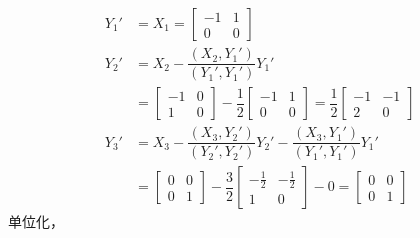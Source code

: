 \documentclass[12pt, a4paper, oneside, fontset=none]{ctexart}
\begin{document}
\begin{align*}
    Y_1' & = X_1 = \begin{bmatrix}
                       -1 & 1 \\
                       0  & 0
                   \end{bmatrix}                                                              \\
    Y_2' & = X_2 - \dfrac{(X_2, Y_1')}{(Y_1',Y_1')}Y_1'                                        \\
         & = \begin{bmatrix}
                 -1 & 0 \\
                 1  & 0
             \end{bmatrix} - \dfrac{1}{2}\begin{bmatrix}
                                             -1 & 1 \\
                                             0  & 0
                                         \end{bmatrix}
    = \dfrac{1}{2}\begin{bmatrix}
                      -1 & -1 \\
                      2  & 0
                  \end{bmatrix}                                                               \\
    Y_3' & = X_3 - \dfrac{(X_3,Y_2')}{(Y_2', Y_2')}Y_2' - \dfrac{(X_3, Y_1')}{(Y_1',Y_1')}Y_1' \\
         & = \begin{bmatrix}
                 0 & 0 \\
                 0 & 1
             \end{bmatrix} - \dfrac{3}{2}\begin{bmatrix}
                                             -\frac{1}{2} & -\frac{1}{2} \\
                                             1            & 0
                                         \end{bmatrix} - 0
    = \begin{bmatrix}
          0 & 0 \\
          0 & 1
      \end{bmatrix}
\end{align*}
单位化，
\end{document}
